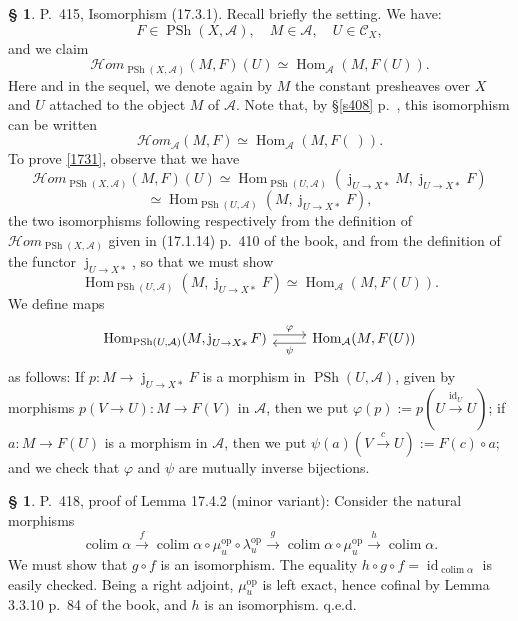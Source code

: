 \documentclass[12pt]{article}
\theoremstyle{remark}
\theoremstyle{definition}
\newtheorem{s}[thm]{\S}
\newcommand{\cc}{\mathcal}
\newcommand{\oo}{\operatorname}
\newcommand{\A}{\mathcal A}
\newcommand{\C}{\mathcal C}
\newcommand{\pp}{\varphi}
\newcommand{\HOM}{\cc H\!\mathit{om}}
\newcommand{\xr}{\xrightarrow}
\DeclareMathOperator*{\colim}{colim}
\DeclareMathOperator{\id}{id}
\DeclareMathOperator{\Hom}{Hom}
\DeclareMathOperator{\op}{op}
\begin{document}
%

\begin{s}
P.~415, Isomorphism (17.3.1). Recall briefly the setting. We have: 
$$
F\in\oo{PSh}(X,\A),\quad M\in\A,\quad U\in\C_X,
$$ 
and we claim 
%
\begin{equation}\label{1731}
\HOM_{\oo{PSh}(X,\A)}(M,F)(U)\simeq\Hom_\A(M,F(U)).
\end{equation} 
%
Here and in the sequel, we denote again by $M$ the constant presheaves over $X$ and $U$ attached to the object $M$ of $\A$. Note that, by \S\ref{s408} p.~\pageref{s408}, this isomorphism can be written 
$$
\HOM_\A(M,F)\simeq\Hom_\A(M,F(\ )).
$$ 
To prove \eqref{1731}, observe that we have  
$$
\HOM_{\oo{PSh}(X,\A)}(M,F)(U)\simeq\Hom_{\oo{PSh}(U,\A)}(\oo j_{U\to X*}M,\oo j_{U\to X*}F)
$$ 
$$
\simeq\Hom_{\oo{PSh}(U,\A)}(M,\oo j_{U\to X*}F), 
$$ 
the two isomorphisms following respectively from the definition of $\HOM_{\oo{PSh}(X,\A)}$ given in (17.1.14) p.~410 of the book, and from the definition of the functor $\oo j_{U\to X*}$, so that we must show 
$$
\Hom_{\oo{PSh}(U,\A)}(M,\oo j_{U\to X*}F)\simeq\Hom_\A(M,F(U)).
$$
We define maps 
$$
\begin{tikzcd}
\Hom_{\oo{PSh}(U,\A)}(M,\oo j_{U\to X*}F)\ar[yshift=0.7ex]{r}{\pp}&\Hom_\A(M,F(U))\ar[yshift=-0.7ex]{l}{\psi}
\end{tikzcd} 
$$ 
as follows: If $p:M\to\oo j_{U\to X*}F$ is a morphism in $\oo{PSh}(U,\A)$, given by morphisms $p(V\to U):M\to F(V)$ in $\A$, then we put $\pp(p):=p(U\xr{\id_U}U)$; if $a:M\to F(U)$ is a morphism in $\A$, then we put $\psi(a)(V\xr cU):=F(c)\circ a$; and we check that $\pp$ and $\psi$ are mutually inverse bijections. 
\end{s}

%

\begin{s} 
P.~418, proof of Lemma 17.4.2 (minor variant): Consider the natural morphisms 
$$
\colim\alpha\xr f\colim\alpha\circ\mu_u^{\op}\circ\lambda_u^{\op}\xr g\colim\alpha\circ\mu_u^{\op}\xr h\colim\alpha.
$$
We must show that $g\circ f$ is an isomorphism. The equality $h\circ g\circ f=\id_{\colim\alpha}$ is easily checked. Being a right adjoint, $\mu_u^{\op}$ is left exact, hence cofinal by Lemma 3.3.10 p.~84 of the book, and $h$ is an isomorphism. q.e.d.
\end{s}  

%
\end{document}
